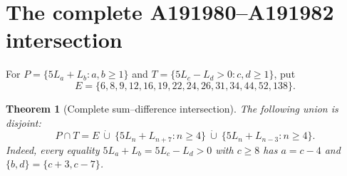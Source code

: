 \documentclass[11pt]{article}
\newtheorem{theorem}{Theorem}
\begin{document}
\section*{The complete A191980--A191982 intersection}
For $P=\{5L_a+L_b:a,b\ge1\}$ and
$T=\{5L_c-L_d>0:c,d\ge1\}$, put
\[
E=\{6,8,9,12,16,19,22,24,26,31,34,44,52,138\}.
\]
\begin{theorem}[Complete sum--difference intersection]\label{thm:sum-full-overlap}
The following union is disjoint:
\begin{equation}\label{eq:sum-full-overlap}
\boxed{P\cap T=E\ \dot\cup\
 \{5L_n+L_{n+7}:n\ge4\}\ \dot\cup\
 \{5L_n+L_{n-3}:n\ge4\}.}
\end{equation}
Indeed, every equality $5L_a+L_b=5L_c-L_d>0$
with $c\ge8$ has $a=c-4$ and
$\{b,d\}=\{c+3,c-7\}$.
\end{theorem}
\end{document}
